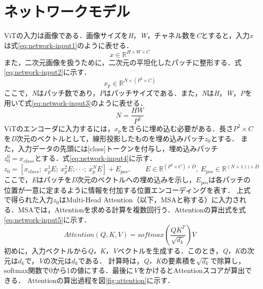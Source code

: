 \documentclass[a4paper, oneside, openany, dvipdfmx]{suribt}%
\newcommand{\fref}[1]{図\ref{#1}}
\newcommand{\eref}[1]{式\eqref{#1}}
\begin{document}
\section{ネットワークモデル}
ViTの入力は画像である．画像サイズを\textit{H}，\textit{W}，チャネル数を\textit{C}とすると，入力\textit{x}は\eref{eq:network-input1}のように表せる．
\begin{equation}
  x\in\mathbb{R}^{H\times W\times C}
  \label{eq:network-input1}
\end{equation}
また，二次元画像を扱うために，二次元の平坦化したパッチに整形する．\eref{eq:network-input2}に示す．
\begin{equation}
  x_{p}\in\mathbb{R}^{N\times(P^{2}\times C)}
  \label{eq:network-input2}
\end{equation}
ここで，\textit{N}はパッチ数であり，\textit{P}はパッチサイズである．また，\textit{N}は\textit{H}，\textit{W}，\textit{P}を用いて\eref{eq:network-input3}のように表せる．
\begin{equation}
  N=\frac{HW}{P^{2}}
  \label{eq:network-input3}
\end{equation}
ViTのエンコーダに入力するには，$x_{p}$をさらに埋め込む必要がある．長さ$P^{2}\times C$を\textit{D}次元のベクトルとして，線形投影したものを埋め込みパッチ$z_{0}$とする．
また，入力データの先頭には[class]トークンを付与し，埋め込みパッチ$z^{0}_{0}=x_{class}とする$．\eref{eq:network-input4}に示す．
\begin{equation}
  z_{0}=[x_{class};\ x^{1}_{p}E;\ x^{2}_{p}E;\cdot\cdot\cdot;\ x^{N}_{p}E]+E_{pos},\qquad E\in\mathbb{R}^{(P^{2}\times C)\times D},\ E_{pos}\in\mathbb{R}^{(N+1))\times D}
  \label{eq:network-input4}
\end{equation}
ここで，\textit{E}はパッチを\textit{D}次元のベクトルへの埋め込みを示し，$E_{pos}$は各パッチの位置が一意に定まるように情報を付加する位置エンコーディングを表す．
上式で得られた入力$z_{0}$はMulti-Head Attention（以下，MSAと称する）に入力される．MSAでは，Attentionを求める計算を複数回行う．Attentionの算出式を\eref{eq:network-input5}に示す．
\begin{equation}
  Attention(Q,K,V) = softmax(\frac{QK^{T}}{\sqrt{d_{k}}})V
  \label{eq:network-input5}
\end{equation}
初めに，入力ベクトルから\textit{Q，K，V}ベクトルを生成する．このとき，\textit{Q，K}の次元は$d_{k}$で，\textit{V}の次元は$d_{k}$である．
計算時は，\textit{Q，K}の要素積を$\sqrt{d_{k}}$で除算し，softmax関数で0から1の値にする．最後に\textit{V}をかけるとAttentionスコアが算出できる．
Attentionの算出過程を\fref{fig:attention}に示す．
\end{document}
